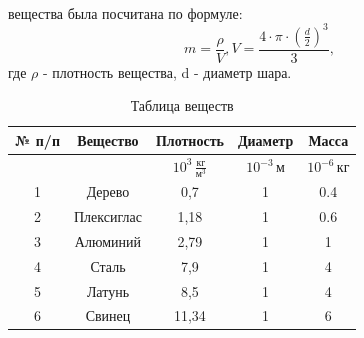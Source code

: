 \\
 вещества была посчитана по формуле:
\begin{equation}
\label{eq:6}
    m=\frac{\rho}{V},  V=\frac{4\cdot\pi\cdot(\frac{d}{2})^3}{3},
\end{equation}
где $\rho$ - плотность вещества, d - диаметр шара.
\begin{center}
\begin{table}[H]
\centering
\caption{Таблица веществ}
\label{table:1}
\begin{tabular}{|c|c|c|c|c|}
\hline
{} № п/п & Вещество & Плотность & Диаметр & Масса \\
\hline
{} &  & \( 10^3 \, \frac{\text{кг}}{\text{м}^3} \) & \( 10^{-3} \, \text{м} \) & \( 10^{-6} \, \text{кг} \) \\
\hline
1 & Дерево & 0,7 & 1 & 0.4  \\
2 & Плексиглас & 1,18 & 1 & 0.6  \\
3 & Алюминий & 2,79 & 1 & 1  \\
4 & Сталь & 7,9 & 1 &  4 \\
5 & Латунь & 8,5 & 1 & 4  \\
6 & Свинец & 11,34 & 1 &  6 \\
\hline
\end{tabular}
\end{table}
\end{center}


